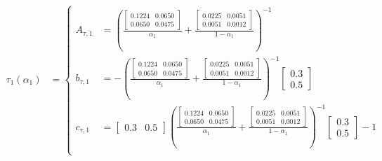 \begin{example}
\begin{align}
    \tau_1(\alpha_1) &= \left\{
        \begin{aligned}
            A_{\tau,1} &= \left({\frac{\left[\begin{smallmatrix}0.1224 & 0.0650\\0.0650& 0.0475\end{smallmatrix}\right]}{\alpha_1}
                                  +\frac{\left[\begin{smallmatrix}0.0225 & 0.0051\\0.0051& 0.0012\end{smallmatrix}\right]}{1-\alpha_1}}\right)^{-1} \\
            b_{\tau,1} &= -\left({\frac{\left[\begin{smallmatrix}0.1224 & 0.0650\\0.0650& 0.0475\end{smallmatrix}\right]}{\alpha_1}
                                  +\frac{\left[\begin{smallmatrix}0.0225 & 0.0051\\0.0051& 0.0012\end{smallmatrix}\right]}{1-\alpha_1}}\right)^{-1} 
                          \left[\begin{smallmatrix}0.3\\0.5\end{smallmatrix}\right]\\
            c_{\tau,1} &= \left[\begin{smallmatrix}0.3&0.5\end{smallmatrix}\right] 
                            \left({\frac{\left[\begin{smallmatrix}0.1224 & 0.0650\\0.0650& 0.0475\end{smallmatrix}\right]}{\alpha_1}
                                  +\frac{\left[\begin{smallmatrix}0.0225 & 0.0051\\0.0051& 0.0012\end{smallmatrix}\right]}{1-\alpha_1}}\right)^{-1} 
                          \left[\begin{smallmatrix}0.3\\0.5\end{smallmatrix}\right] -1\\
        \end{aligned}\right.
\end{align}


\end{example}

